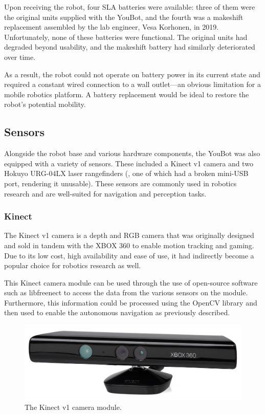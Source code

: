 \documentclass[a4paper, 12pt]{article}
\newif\ifshownotes
\newcommand{\notes}[1]{\ifshownotes\textcolor{blue}{#1}\fi}
\begin{document}
    Upon receiving the robot, four SLA batteries were available: three of them were the original units supplied with the YouBot, and the fourth was a makeshift replacement assembled by the lab engineer, Vesa Korhonen, in 2019. Unfortunately, none of these batteries were functional. The original units had degraded beyond usability, and the makeshift battery had similarly deteriorated over time.

    As a result, the robot could not operate on battery power in its current state and required a constant wired connection to a wall outlet—an obvious limitation for a mobile robotics platform. A battery replacement would be ideal to restore the robot's potential mobility. 


    
    

    \subsection{Sensors}
    
    Alongside the robot base and various hardware components, the YouBot was also equipped with a variety of sensors. These included a Kinect v1 camera and two Hokuyo URG-04LX laser rangefinders (, one of which had a broken mini-USB port, rendering it unusable). These sensors are commonly used in robotics research and are well-suited for navigation and perception tasks.

    \subsubsection{Kinect}  

    The Kinect v1 camera is a depth and RGB camera that was originally designed and sold in tandem with the XBOX 360 to enable motion tracking and gaming. Due to its low cost, high availability and ease of use, it had indirectly become a popular choice for robotics research as well.

    This Kinect camera module can be used through the use of open-source software such as libfreenect \notes{[cite]} to access the data from the various sensors on the module. Furthermore, this information could be processed using the OpenCV library and then used to enable the autonomous navigation as previously described. 

    \begin{figure}[ht]
        \centering
        \includegraphics[width=0.5\linewidth]{images/sec2/kinectv1.png}
        \caption{The Kinect v1 camera module.}
    \end{figure}
\end{document}

